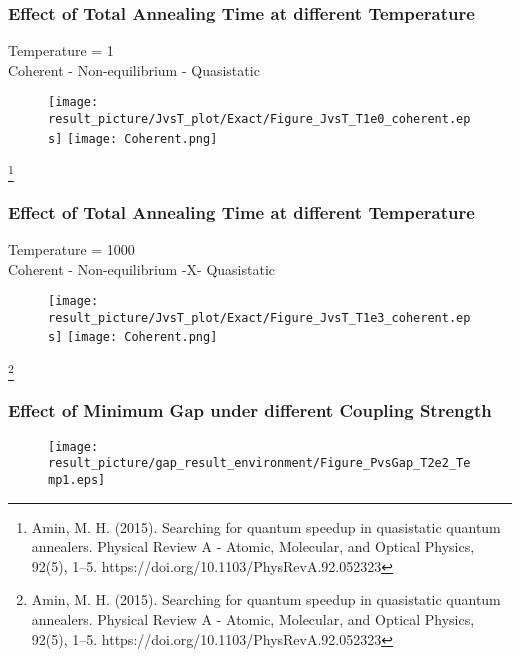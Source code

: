\documentclass{beamer}
\begin{document}
\begin{frame}
	\frametitle{Effect of Total Annealing Time at different Temperature}
	Temperature = 1\\
	Coherent - Non-equilibrium - Quasistatic
	\begin{figure}
		\centering
		\texttt{[image: result\_picture/JvsT\_plot/Exact/Figure\_JvsT\_T1e0\_coherent.eps]}
		\hfill
		\texttt{[image: Coherent.png]}\footnotemark[1]
	\end{figure}
	
	\footnote[1]{Amin, M. H. (2015). Searching for quantum speedup in quasistatic quantum annealers. Physical Review A - Atomic, Molecular, and Optical Physics, 92(5), 1–5. https://doi.org/10.1103/PhysRevA.92.052323}
\end{frame}

\begin{frame}
	\frametitle{Effect of Total Annealing Time at different Temperature}
	Temperature = 1000\\
	Coherent - Non-equilibrium -X- Quasistatic
	\begin{figure}
		\centering
		\texttt{[image: result\_picture/JvsT\_plot/Exact/Figure\_JvsT\_T1e3\_coherent.eps]}
		\hfill
		\texttt{[image: Coherent.png]}\footnotemark[1]		
	\end{figure}
	\footnote[1]{Amin, M. H. (2015). Searching for quantum speedup in quasistatic quantum annealers. Physical Review A - Atomic, Molecular, and Optical Physics, 92(5), 1–5. https://doi.org/10.1103/PhysRevA.92.052323}
\end{frame}

\begin{frame}
	\frametitle{Effect of Minimum Gap under different Coupling Strength }

	\begin{figure}
		\centering
		\texttt{[image: result\_picture/gap\_result\_environment/Figure\_PvsGap\_T2e2\_Temp1.eps]}
		
	\end{figure}
\end{frame}
\end{document}
